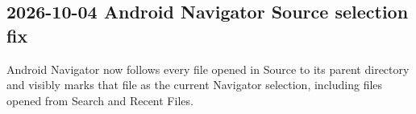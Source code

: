 \documentclass[a4paper]{article}
\title{}
\date{}
\author{Mohammad Rahmani}
\begin{document}
   \maketitle

   \begin{preview}
      \section*{2026-10-04 Android Navigator Source selection fix}
      Android Navigator now follows every file opened in Source to its parent
      directory and visibly marks that file as the current Navigator selection,
      including files opened from Search and Recent Files.
   \end{preview}
\end{document}
